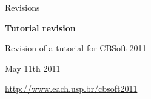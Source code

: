 \begin{rubric}{Revisions}

\entry*[CBSoft]
\textbf{Tutorial revision}

Revision of a tutorial for CBSoft 2011

May 11th 2011

\url {http://www.each.usp.br/cbsoft2011}
\end{rubric}
